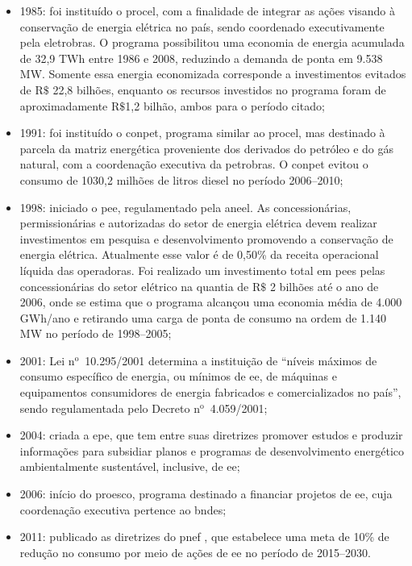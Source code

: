 \begin{itemize}
\item 1985: foi instituído o \gls{procel}, com a finalidade de
integrar as ações visando à conservação de energia elétrica no país,
sendo coordenado executivamente pela \acs{eletrobras}. O programa
possibilitou uma economia de energia acumulada de 32,9 TWh entre 1986
e 2008, reduzindo a demanda de ponta em 9.538 MW. Somente essa energia
economizada corresponde a investimentos evitados de $\text{R\$}$ 22,8
bilhões, enquanto os recursos investidos no programa foram de
aproximadamente $\text{R\$}$1,2 bilhão, ambos para o período citado; 
\item 1991: foi instituído o \gls{conpet}, programa similar ao
\gls{procel}, mas destinado à parcela da matriz energética proveniente
dos derivados do petróleo e do gás natural, com a coordenação
executiva da \acs{petrobras}. O \gls{conpet} evitou o consumo de
1030,2 milhões de litros diesel no período 2006--2010;
\item 1998: iniciado o \gls{pee}, regulamentado pela \gls{aneel}. As
concessionárias, permissionárias e autorizadas do setor de energia
elétrica devem realizar investimentos em pesquisa e desenvolvimento
promovendo a conservação de energia elétrica.  Atualmente esse valor é
de 0,50\% da receita operacional líquida das operadoras.  Foi
realizado um investimento total em \glspl{pee} pelas concessionárias
do setor elétrico na quantia de $\text{R\$}$ 2 bilhões até o ano de
2006, onde se estima que o programa alcançou uma economia média de
4.000 GWh/ano e retirando uma carga de ponta de consumo na ordem de
1.140 MW no período de 1998--2005;
\item 2001: Lei n$^\text{o}$~10.295/2001 determina a instituição de
``níveis máximos de consumo específico de energia, ou mínimos de
\gls{ee}, de máquinas e equipamentos consumidores de energia fabricados e
comercializados no país'', sendo regulamentada pelo Decreto
n$^\text{o}$~4.059/2001;
\item 2004: criada a \gls{epe}, que tem entre suas diretrizes promover
estudos e produzir informações para subsidiar planos e programas de
desenvolvimento energético ambientalmente sustentável, inclusive, de
\gls{ee};
\item 2006: início do \gls{proesco}, programa destinado a financiar
projetos de \gls{ee}, cuja coordenação executiva pertence ao
\gls{bndes};
\item 2011: publicado as diretrizes do \gls{pnef} \cite{pnef}, que
estabelece uma meta de 10\% de redução no consumo por meio de ações de
\gls{ee} no período de 2015--2030.
\end{itemize}

